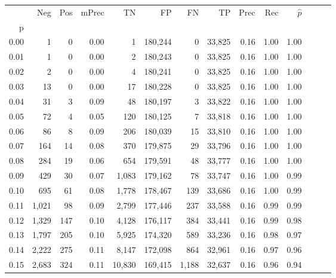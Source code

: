 \begin{tabular}{rrrrrrrrrrrrrr}
\toprule
{} &     Neg &    Pos & mPrec &       TN &       FP &      FN &      TP &  Prec &   Rec & $\hat{p}$ \\
p    &         &        &       &          &          &         &         &       &       &           \\
\midrule
0.00 &       1 &      0 &  0.00 &        1 &  180,244 &       0 &  33,825 &  0.16 &  1.00 &      1.00 \\
0.01 &       1 &      0 &  0.00 &        2 &  180,243 &       0 &  33,825 &  0.16 &  1.00 &      1.00 \\
0.02 &       2 &      0 &  0.00 &        4 &  180,241 &       0 &  33,825 &  0.16 &  1.00 &      1.00 \\
0.03 &      13 &      0 &  0.00 &       17 &  180,228 &       0 &  33,825 &  0.16 &  1.00 &      1.00 \\
0.04 &      31 &      3 &  0.09 &       48 &  180,197 &       3 &  33,822 &  0.16 &  1.00 &      1.00 \\
0.05 &      72 &      4 &  0.05 &      120 &  180,125 &       7 &  33,818 &  0.16 &  1.00 &      1.00 \\
0.06 &      86 &      8 &  0.09 &      206 &  180,039 &      15 &  33,810 &  0.16 &  1.00 &      1.00 \\
0.07 &     164 &     14 &  0.08 &      370 &  179,875 &      29 &  33,796 &  0.16 &  1.00 &      1.00 \\
0.08 &     284 &     19 &  0.06 &      654 &  179,591 &      48 &  33,777 &  0.16 &  1.00 &      1.00 \\
0.09 &     429 &     30 &  0.07 &    1,083 &  179,162 &      78 &  33,747 &  0.16 &  1.00 &      0.99 \\
0.10 &     695 &     61 &  0.08 &    1,778 &  178,467 &     139 &  33,686 &  0.16 &  1.00 &      0.99 \\
0.11 &   1,021 &     98 &  0.09 &    2,799 &  177,446 &     237 &  33,588 &  0.16 &  0.99 &      0.99 \\
0.12 &   1,329 &    147 &  0.10 &    4,128 &  176,117 &     384 &  33,441 &  0.16 &  0.99 &      0.98 \\
0.13 &   1,797 &    205 &  0.10 &    5,925 &  174,320 &     589 &  33,236 &  0.16 &  0.98 &      0.97 \\
0.14 &   2,222 &    275 &  0.11 &    8,147 &  172,098 &     864 &  32,961 &  0.16 &  0.97 &      0.96 \\
0.15 &   2,683 &    324 &  0.11 &   10,830 &  169,415 &   1,188 &  32,637 &  0.16 &  0.96 &      0.94 \\

\end{tabular}
